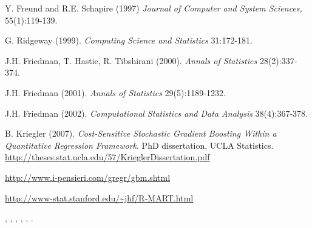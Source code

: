 \documentclass{article}
\begin{document}
\begin{References}\relax
Y. Freund and R.E. Schapire (1997)  \emph{Journal of Computer and
System Sciences,} 55(1):119-139.

G. Ridgeway (1999).  \emph{Computing Science and
Statistics} 31:172-181.

J.H. Friedman, T. Hastie, R. Tibshirani (2000).  \emph{Annals of Statistics} 28(2):337-374.

J.H. Friedman (2001).  \emph{Annals of Statistics} 29(5):1189-1232.

J.H. Friedman (2002).  \emph{Computational Statistics
and Data Analysis} 38(4):367-378.

B. Kriegler (2007). \emph{Cost-Sensitive Stochastic Gradient Boosting Within a 
Quantitative Regression Framework}. PhD dissertation, UCLA Statistics. 
\url{http://theses.stat.ucla.edu/57/KrieglerDissertation.pdf}

\url{http://www.i-pensieri.com/gregr/gbm.shtml}

\url{http://www-stat.stanford.edu/~jhf/R-MART.html}
\end{References}
\begin{SeeAlso}\relax
{},
,
,
,
,
.
\end{SeeAlso}
\end{document}
